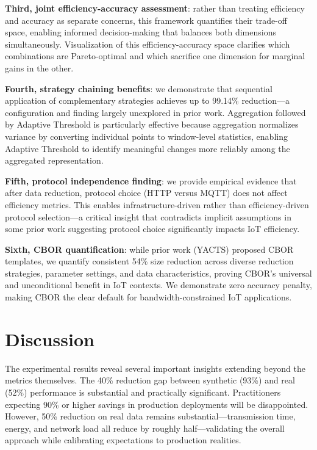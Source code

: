\documentclass[10pt,twocolumn]{article}
\begin{document}
\textbf{Third, joint efficiency-accuracy assessment}: rather than treating efficiency and accuracy as separate concerns, this framework quantifies their trade-off space, enabling informed decision-making that balances both dimensions simultaneously. Visualization of this efficiency-accuracy space clarifies which combinations are Pareto-optimal and which sacrifice one dimension for marginal gains in the other.

\textbf{Fourth, strategy chaining benefits}: we demonstrate that sequential application of complementary strategies achieves up to 99.14\% reduction---a configuration and finding largely unexplored in prior work. Aggregation followed by Adaptive Threshold is particularly effective because aggregation normalizes variance by converting individual points to window-level statistics, enabling Adaptive Threshold to identify meaningful changes more reliably among the aggregated representation.

\textbf{Fifth, protocol independence finding}: we provide empirical evidence that after data reduction, protocol choice (HTTP versus MQTT) does not affect efficiency metrics. This enables infrastructure-driven rather than efficiency-driven protocol selection---a critical insight that contradicts implicit assumptions in some prior work suggesting protocol choice significantly impacts IoT efficiency.

\textbf{Sixth, CBOR quantification}: while prior work (YACTS) proposed CBOR templates, we quantify consistent 54\% size reduction across diverse reduction strategies, parameter settings, and data characteristics, proving CBOR's universal and unconditional benefit in IoT contexts. We demonstrate zero accuracy penalty, making CBOR the clear default for bandwidth-constrained IoT applications.

\section{Discussion}

The experimental results reveal several important insights extending beyond the metrics themselves. The 40\% reduction gap between synthetic (93\%) and real (52\%) performance is substantial and practically significant. Practitioners expecting 90\% or higher savings in production deployments will be disappointed. However, 50\% reduction on real data remains substantial---transmission time, energy, and network load all reduce by roughly half---validating the overall approach while calibrating expectations to production realities.
\end{document}
